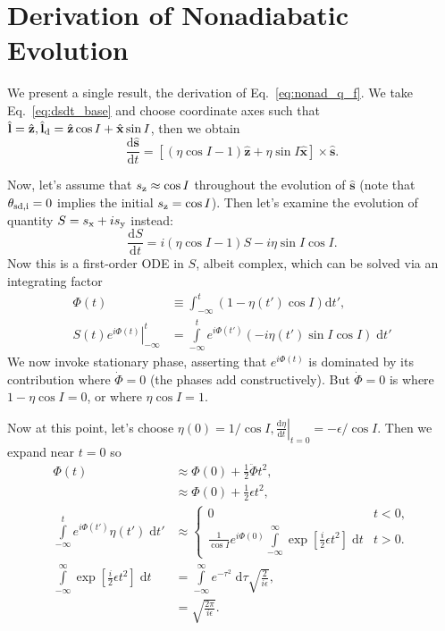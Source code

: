 \documentclass[
        fleqn,
        usenatbib,
    ]{mnras}
\newcommand*{\rd}[2]{\frac{\mathrm{d}#1}{\mathrm{d}#2}}
\newcommand*{\at}[1]{\left.#1\right|}
\newcommand*{\bm}[1]{\boldsymbol{\mathbf{#1}}}
\newcommand*{\uv}[1]{\hat{\bm{#1}}}
\newcommand*{\p}[1]{\left(#1\right)}
\newcommand*{\s}[1]{\left[#1\right]}
\begin{document}
\section{Derivation of Nonadiabatic Evolution}\label{s:nonad_app}

We present a single result, the derivation of Eq.~\eqref{eq:nonad_q_f}. We take
Eq.~\eqref{eq:dsdt_base} and choose coordinate axes such that $\uv{l} = \uv{z},
\uv{l}_{\rm d} = \uv{z} \cos I + \uv{x}\sin I$, then we obtain
\begin{equation}
    \rd{\uv{s}}{t} = \s{
        \p{\eta \cos I - 1}\uv{z} + \eta \sin I \uv{x}} \times \uv{s}.
\end{equation}

Now, let's assume that $s_{\rm z} \approx \cos I$ throughout the evolution of
$\uv{s}$ (note that $\theta_{\rm sd, i} = 0$ implies the initial $s_{\rm z} = \cos
I$). Then let's examine the evolution of quantity $S = s_{\rm x} + is_{\rm y}$ instead:
\begin{equation}
    \rd{S}{t} = i\p{\eta\cos I - 1}S - i \eta \sin I\cos I.\label{eq:nonad_ode}
\end{equation}
Now this is a first-order ODE in $S$, albeit complex, which can be solved via
an integrating factor
\begin{align}
    \Phi(t) &\equiv \int_{-\infty}^t \p{1 - \eta(t') \cos I}
        \mathrm{d}t',\\
    \at{S(t) e^{i\Phi(t)}}_{-\infty}^t
        &= \int\limits_{-\infty}^t e^{i\Phi(t')}
            \p{-i\eta(t')\sin I\cos I}\;\mathrm{d}t'\label{eq:nonad_int}
\end{align}
We now invoke stationary phase, asserting that $e^{i\Phi(t)}$ is dominated by
its contribution where $\dot{\Phi} = 0$ (the phases add constructively). But
$\dot{\Phi} = 0$ is where $1 - \eta\cos I = 0$, or where $\eta\cos I = 1$.

Now at this point, let's choose $\eta(0) = 1/\cos I, \at{\rd{\eta}{t}}_{t=0} =
-\epsilon/\cos I$. Then we expand near $t = 0$ so
\begin{align}
    \Phi(t) &\approx \Phi(0) + \frac{1}{2}\ddot{\Phi}t^2,\\
        &\approx \Phi(0) + \frac{1}{2}\epsilon t^2,\\
    \int\limits_{-\infty}^t e^{i\Phi(t')}\eta(t')\;\mathrm{d}t'
        &\approx
        \begin{cases}
            0 & t < 0,\\
            \frac{1}{\cos I}e^{i\Phi(0)}\int\limits_{-\infty}^\infty
                \exp\s{\frac{i}{2}\epsilon t^2}\;\mathrm{d}t
                & t > 0.
        \end{cases}\\
    \int\limits_{-\infty}^\infty
                \exp\s{\frac{i}{2}\epsilon t^2}\;\mathrm{d}t
        &= \int\limits_{-\infty}^\infty e^{-\tau^2}\;\mathrm{d}\tau
            \sqrt{\frac{2}{i\epsilon}},\\
        &= \sqrt{\frac{2\pi}{i\epsilon}}.
\end{align}
\end{document}
